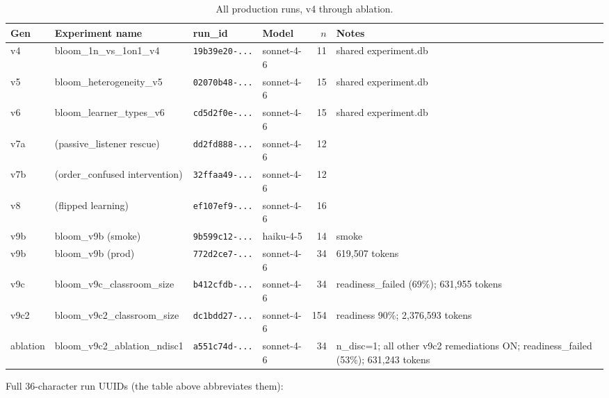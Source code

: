 \documentclass[11pt]{article}
\begin{document}
\begin{table}[h]
\centering
\caption{All production runs, v4 through ablation.}
\label{tab:run-index}
\footnotesize
\begin{tabular}{@{}lp{2.9cm}p{3.4cm}lrp{3.6cm}@{}}
\toprule
Gen & Experiment name & run\_id & Model & $n$ & Notes \\
\midrule
v4       & bloom\_1n\_vs\_1on1\_v4             & \texttt{19b39e20-...} & sonnet-4-6 &  11 & shared experiment.db \\
v5       & bloom\_heterogeneity\_v5            & \texttt{02070b48-...} & sonnet-4-6 &  15 & shared experiment.db \\
v6       & bloom\_learner\_types\_v6           & \texttt{cd5d2f0e-...} & sonnet-4-6 &  15 & shared experiment.db \\
v7a      & (passive\_listener rescue)          & \texttt{dd2fd888-...} & sonnet-4-6 &  12 & \\
v7b      & (order\_confused intervention)      & \texttt{32ffaa49-...} & sonnet-4-6 &  12 & \\
v8       & (flipped learning)                  & \texttt{ef107ef9-...} & sonnet-4-6 &  16 & \\
v9b      & bloom\_v9b (smoke)                  & \texttt{9b599c12-...} & haiku-4-5  &  14 & smoke \\
v9b      & bloom\_v9b (prod)                   & \texttt{772d2ce7-...} & sonnet-4-6 &  34 & 619,507 tokens \\
v9c      & bloom\_v9c\_classroom\_size         & \texttt{b412cfdb-...} & sonnet-4-6 &  34 & readiness\_failed (69\%); 631,955 tokens \\
v9c2     & bloom\_v9c2\_classroom\_size        & \texttt{dc1bdd27-...} & sonnet-4-6 & 154 & readiness 90\%; 2,376,593 tokens \\
ablation & bloom\_v9c2\_ablation\_ndisc1       & \texttt{a551c74d-...} & sonnet-4-6 &  34 & n\_disc=1; all other v9c2 remediations ON; readiness\_failed (53\%); 631,243 tokens \\
\bottomrule
\end{tabular}
\end{table}

Full 36-character run UUIDs (the table above abbreviates them):
\end{document}
